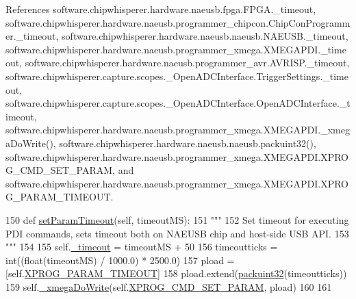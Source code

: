 References software.\+chipwhisperer.\+hardware.\+naeusb.\+fpga.\+F\+P\+G\+A.\+\_\+timeout, software.\+chipwhisperer.\+hardware.\+naeusb.\+programmer\+\_\+chipcon.\+Chip\+Con\+Programmer.\+\_\+timeout, software.\+chipwhisperer.\+hardware.\+naeusb.\+naeusb.\+N\+A\+E\+U\+S\+B.\+\_\+timeout, software.\+chipwhisperer.\+hardware.\+naeusb.\+programmer\+\_\+xmega.\+X\+M\+E\+G\+A\+P\+D\+I.\+\_\+timeout, software.\+chipwhisperer.\+hardware.\+naeusb.\+programmer\+\_\+avr.\+A\+V\+R\+I\+S\+P.\+\_\+timeout, software.\+chipwhisperer.\+capture.\+scopes.\+\_\+\+Open\+A\+D\+C\+Interface.\+Trigger\+Settings.\+\_\+timeout, software.\+chipwhisperer.\+capture.\+scopes.\+\_\+\+Open\+A\+D\+C\+Interface.\+Open\+A\+D\+C\+Interface.\+\_\+timeout, software.\+chipwhisperer.\+hardware.\+naeusb.\+programmer\+\_\+xmega.\+X\+M\+E\+G\+A\+P\+D\+I.\+\_\+xmega\+Do\+Write(), software.\+chipwhisperer.\+hardware.\+naeusb.\+naeusb.\+packuint32(), software.\+chipwhisperer.\+hardware.\+naeusb.\+programmer\+\_\+xmega.\+X\+M\+E\+G\+A\+P\+D\+I.\+X\+P\+R\+O\+G\+\_\+\+C\+M\+D\+\_\+\+S\+E\+T\+\_\+\+P\+A\+R\+A\+M, and software.\+chipwhisperer.\+hardware.\+naeusb.\+programmer\+\_\+xmega.\+X\+M\+E\+G\+A\+P\+D\+I.\+X\+P\+R\+O\+G\+\_\+\+P\+A\+R\+A\+M\+\_\+\+T\+I\+M\+E\+O\+U\+T.


\begin{DoxyCode}
150     \textcolor{keyword}{def }\hyperlink{classsoftware_1_1chipwhisperer_1_1hardware_1_1naeusb_1_1programmer__xmega_1_1XMEGAPDI_aed2a15c46c5d39f174358456b128337e}{setParamTimeout}(self, timeoutMS):
151         \textcolor{stringliteral}{"""}
152 \textcolor{stringliteral}{        Set timeout for executing PDI commands, sets timeout both on NAEUSB chip and host-side USB API.}
153 \textcolor{stringliteral}{        """}
154 
155         self.\hyperlink{classsoftware_1_1chipwhisperer_1_1hardware_1_1naeusb_1_1programmer__xmega_1_1XMEGAPDI_a5addb05ae877f84041df1603ba7f7cb4}{\_timeout} = timeoutMS + 50
156         timeoutticks = int((float(timeoutMS) / 1000.0) * 2500.0)
157         pload = [self.\hyperlink{classsoftware_1_1chipwhisperer_1_1hardware_1_1naeusb_1_1programmer__xmega_1_1XMEGAPDI_a2ebffaae33ab69c7c29136b06936f6fe}{XPROG\_PARAM\_TIMEOUT}]
158         pload.extend(\hyperlink{namespacesoftware_1_1chipwhisperer_1_1hardware_1_1naeusb_1_1naeusb_a51ac98c158e5ef60f6b600a4761ed279}{packuint32}(timeoutticks))
159         self.\hyperlink{classsoftware_1_1chipwhisperer_1_1hardware_1_1naeusb_1_1programmer__xmega_1_1XMEGAPDI_a150ce3e3429efdbfda97298218fc65f9}{\_xmegaDoWrite}(self.\hyperlink{classsoftware_1_1chipwhisperer_1_1hardware_1_1naeusb_1_1programmer__xmega_1_1XMEGAPDI_a60fe64bc524d391ff8d79a99f034190a}{XPROG\_CMD\_SET\_PARAM}, pload)
160 
161 
\end{DoxyCode}
\hypertarget{classsoftware_1_1chipwhisperer_1_1hardware_1_1naeusb_1_1programmer__xmega_1_1XMEGAPDI_a6bd915fe8154e77d629915c3b0e942d8}{}

